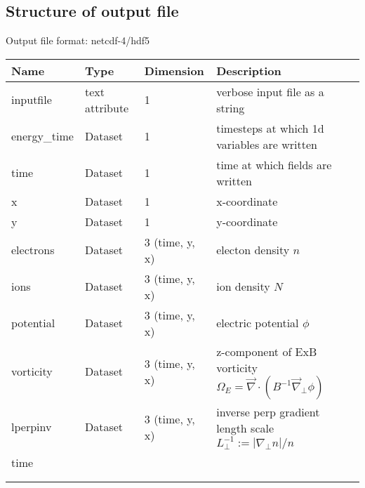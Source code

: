 \subsection{Structure of output file}
Output file format: netcdf-4/hdf5
%
\begin{longtable}{lll>{\RaggedRight}p{7cm}}
\toprule
\rowcolor{gray!50}\textbf{Name} & 
 \textbf{Type} & \textbf{Dimension} & \textbf{Description}  \\ \midrule
inputfile  &             text attribute & 1 & verbose input file as a string \\
energy\_time             & Dataset & 1 & timesteps at which 1d variables are 
written \\
time                     & Dataset & 1 & time at which fields are written \\
x                        & Dataset & 1 & x-coordinate  \\
y                        & Dataset & 1 & y-coordinate \\
electrons                & Dataset & 3 (time, y, x) & electon density $n$ \\
ions                     & Dataset & 3 (time, y, x) & ion density $N$ \\
potential                & Dataset & 3 (time, y, x) & electric potential $\phi$  
\\
vorticity                & Dataset & 3 (time, y, x) & z-component of ExB 
vorticity  $\Omega_E = \vec{\nabla}\cdot (B^{-1} \vec{\nabla}_{\perp}\phi)$  \\
lperpinv                 & Dataset & 3 (time, y, x) & inverse perp gradient 
length scale $L_\perp^{-1} := |\nabla_\perp n| / n$ \\
time  \\
\\
\\
\bottomrule
\end{longtable}




